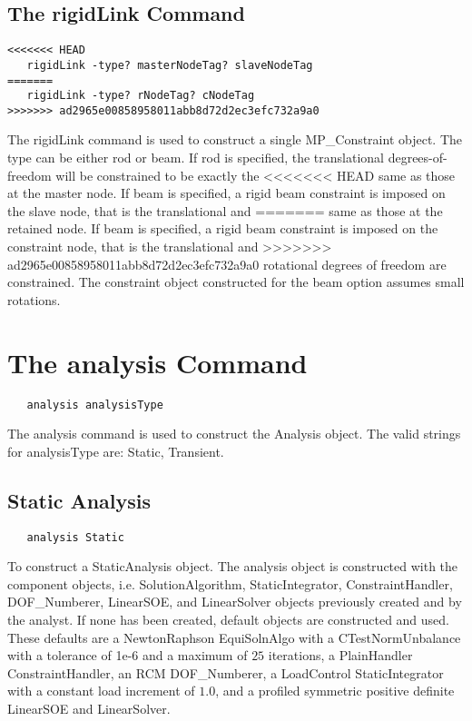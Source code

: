 \documentclass[12pt]{article}
\begin{document}
\subsection{The rigidLink Command}
{\sf\small
\begin{verbatim}
<<<<<<< HEAD
   rigidLink -type? masterNodeTag? slaveNodeTag
=======
   rigidLink -type? rNodeTag? cNodeTag
>>>>>>> ad2965e00858958011abb8d72d2ec3efc732a9a0
\end{verbatim}
}

The rigidLink command is used to construct a single MP\_Constraint object.
The type can be either rod or beam. If rod is specified, the
translational degrees-of-freedom will be constrained to be exactly the
<<<<<<< HEAD
same as those at the master node. If beam is specified, a rigid beam
constraint is imposed on the slave node, that is the translational and
=======
same as those at the retained node. If beam is specified, a rigid beam
constraint is imposed on the constraint node, that is the translational and
>>>>>>> ad2965e00858958011abb8d72d2ec3efc732a9a0
rotational degrees of freedom are constrained. The constraint object
constructed for the beam option assumes small rotations.

\section {The analysis Command}

{\sf\small
\begin{verbatim}
   analysis analysisType 
\end{verbatim}
}

The analysis command is used to construct the Analysis object.
The valid strings for analysisType are: Static, Transient. 

\subsection{Static Analysis}

{\sf\small
\begin{verbatim}
   analysis Static 
\end{verbatim}
}

To construct a StaticAnalysis object. The analysis object is
constructed with the component objects, i.e. SolutionAlgorithm, StaticIntegrator,
ConstraintHandler, DOF\_Numberer, LinearSOE, and LinearSolver objects
previously created and by the analyst. If none has been created,
default objects are constructed and used. These defaults are a
NewtonRaphson EquiSolnAlgo with a CTestNormUnbalance with a tolerance
of 1e-6 and a maximum of $25$ iterations, a PlainHandler
ConstraintHandler, an RCM DOF\_Numberer, a LoadControl
StaticIntegrator with a constant load increment of $1.0$, and a
profiled symmetric positive definite LinearSOE and LinearSolver.
\end{document}
